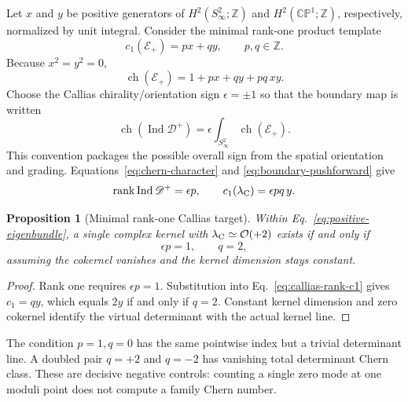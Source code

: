 \documentclass[11pt]{article}
\newtheorem{proposition}[theorem]{Proposition}
\theoremstyle{definition}
\theoremstyle{remark}
\newcommand{\ZZ}{\mathbb Z}
\newcommand{\CP}{\mathbb {CP}}
\newcommand{\cO}{\mathcal O}
\newcommand{\cE}{\mathcal E}
\newcommand{\Ind}{\operatorname{Ind}}
\begin{document}
Let \(x\) and \(y\) be positive generators of
\(H^2(S^2_\infty;\ZZ)\) and \(H^2(\CP^1;\ZZ)\), respectively, normalized by
unit integral.  Consider the minimal rank-one product template
\begin{equation}
 c_1(\cE_+)=p x+q y,
 \qquad p,q\in\ZZ.
 \label{eq:positive-eigenbundle}
\end{equation}
Because \(x^2=y^2=0\),
\begin{equation}
 \operatorname{ch}(\cE_+)
 =1+p x+q y+p q\,x y.
 \label{eq:chern-character}
\end{equation}
Choose the Callias chirality/orientation sign \(\epsilon=\pm1\) so that the
boundary map is written
\begin{equation}
 \operatorname{ch}(\Ind\mathscr D^+)
 =\epsilon\int_{S^2_\infty}\operatorname{ch}(\cE_+).
 \label{eq:boundary-pushforward}
\end{equation}
This convention packages the possible overall sign from the spatial
orientation and grading.  Equations~\eqref{eq:chern-character} and
\eqref{eq:boundary-pushforward} give
\begin{equation}
 \operatorname{rank}\Ind\mathscr D^+=\epsilon p,
 \qquad
 c_1(\lambda_{\rm C})=\epsilon p q\,y.
 \label{eq:callias-rank-c1}
\end{equation}

\begin{proposition}[Minimal rank-one Callias target]
Within Eq.~\eqref{eq:positive-eigenbundle}, a single complex kernel with
\(\lambda_{\rm C}\simeq\cO(+2)\) exists if and only if
\begin{equation}
 \epsilon p=1,
 \qquad q=2,
 \label{eq:callias-target}
\end{equation}
assuming the cokernel vanishes and the kernel dimension stays constant.
\end{proposition}
\begin{proof}
Rank one requires \(\epsilon p=1\).  Substitution into
Eq.~\eqref{eq:callias-rank-c1} gives \(c_1=q y\), which equals \(2y\) if and
only if \(q=2\).  Constant kernel dimension and zero cokernel identify the
virtual determinant with the actual kernel line.
\end{proof}

The condition \(p=1,q=0\) has the same pointwise index but a trivial
determinant line.  A doubled pair \(q=+2\) and \(q=-2\) has vanishing total
determinant Chern class.  These are decisive negative controls: counting a
single zero mode at one moduli point does not compute a family Chern number.
\end{document}
